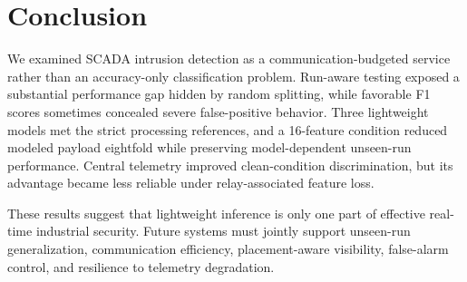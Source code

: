 \documentclass[conference]{IEEEtran}
\begin{document}
\FloatBarrier
\section{Conclusion}

We examined SCADA intrusion detection as a communication-budgeted service
rather than an accuracy-only classification problem. Run-aware testing exposed
a substantial performance gap hidden by random splitting, while favorable F1
scores sometimes concealed severe false-positive behavior. Three lightweight
models met the strict processing references, and a 16-feature condition
reduced modeled payload eightfold while preserving model-dependent unseen-run
performance. Central telemetry improved clean-condition discrimination, but
its advantage became less reliable under relay-associated feature loss.

These results suggest that lightweight inference is only one part of effective
real-time industrial security. Future systems must jointly support unseen-run
generalization, communication efficiency, placement-aware visibility,
false-alarm control, and resilience to telemetry degradation.


\FloatBarrier
\balance
\end{document}
